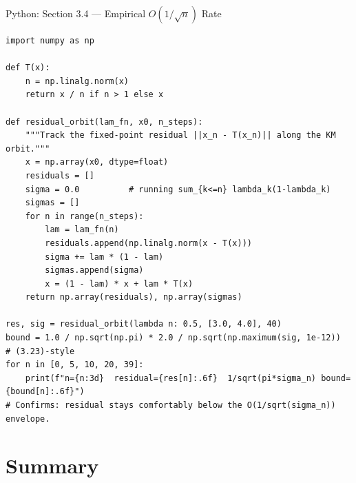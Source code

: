 \documentclass[aspectratio=169,10pt]{beamer}
\begin{document}
\begin{frame}[fragile]{Python: Section 3.4 --- Empirical $O(1/\sqrt n)$ Rate}
  \begin{lstlisting}[style=python]
import numpy as np

def T(x):
    n = np.linalg.norm(x)
    return x / n if n > 1 else x

def residual_orbit(lam_fn, x0, n_steps):
    """Track the fixed-point residual ||x_n - T(x_n)|| along the KM orbit."""
    x = np.array(x0, dtype=float)
    residuals = []
    sigma = 0.0          # running sum_{k<=n} lambda_k(1-lambda_k)
    sigmas = []
    for n in range(n_steps):
        lam = lam_fn(n)
        residuals.append(np.linalg.norm(x - T(x)))
        sigma += lam * (1 - lam)
        sigmas.append(sigma)
        x = (1 - lam) * x + lam * T(x)
    return np.array(residuals), np.array(sigmas)

res, sig = residual_orbit(lambda n: 0.5, [3.0, 4.0], 40)
bound = 1.0 / np.sqrt(np.pi) * 2.0 / np.sqrt(np.maximum(sig, 1e-12))  # (3.23)-style
for n in [0, 5, 10, 20, 39]:
    print(f"n={n:3d}  residual={res[n]:.6f}  1/sqrt(pi*sigma_n) bound={bound[n]:.6f}")
# Confirms: residual stays comfortably below the O(1/sqrt(sigma_n)) envelope.
  \end{lstlisting}
\end{frame}

\section{Summary}
\end{document}
